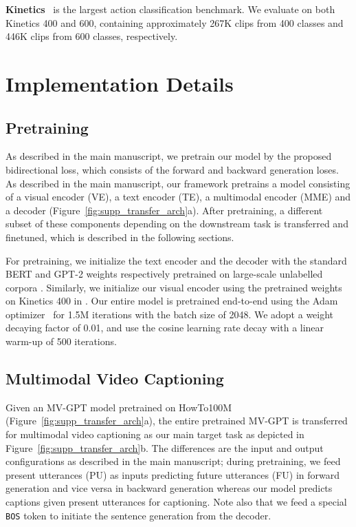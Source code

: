 \documentclass[10pt,twocolumn,letterpaper]{article}
\begin{document}
\noindent\textbf{Kinetics}~\cite{kay2017kinetics} is the largest action classification benchmark.
We evaluate on both Kinetics 400 and 600, containing approximately 267K clips from 400 classes and 446K clips from 600 classes, respectively.

\section{Implementation Details} \label{sec:supp-impl-details}

\subsection{Pretraining}
As described in the main manuscript, we pretrain our model by the proposed bidirectional loss, which consists of the forward and backward generation loses.
As described in the main manuscript, our framework pretrains a model consisting of a visual encoder (VE), a text encoder (TE), a multimodal encoder (MME) and a decoder (Figure~\ref{fig:supp_transfer_arch}a).
After pretraining, a different subset of these components depending on the downstream task is transferred and finetuned, which is described in the following sections.

For pretraining, we initialize the text encoder and the decoder with the standard BERT and GPT-2 weights respectively pretrained on large-scale unlabelled corpora \cite{devlin2018bert,radford2019language}.
Similarly, we initialize our visual encoder using the pretrained weights on Kinetics 400 in \cite{arnab2021vivit}. Our entire model is pretrained end-to-end using the Adam optimizer~\cite{kingma2014adam} for 1.5M iterations with the batch size of 2048. We adopt a weight decaying factor of 0.01, and use the cosine learning rate decay with a linear warm-up of 500 iterations.

\subsection{Multimodal Video Captioning}
Given an MV-GPT model pretrained on HowTo100M (Figure~\ref{fig:supp_transfer_arch}a), the entire pretrained MV-GPT is transferred for multimodal video captioning as our main target task as depicted in Figure~\ref{fig:supp_transfer_arch}b.
The differences are the input and output configurations as described in the main manuscript; during pretraining, we feed present utterances (PU) as inputs predicting future utterances (FU) in forward generation and vice versa in backward generation whereas our model predicts captions given present utterances for captioning.
Note also that we feed a special \texttt{BOS} token to initiate the sentence generation from the decoder.
\end{document}
